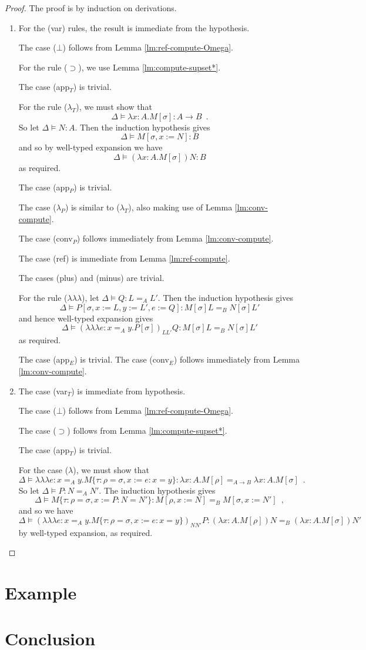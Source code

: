 \documentclass[a4paper,UKenglish]{lipics-v2016}
\newcommand*{\triplelambda}{\ensuremath{\lambda \!\! \lambda \!\! \lambda}}
\theoremstyle{plain}
\begin{document}
\begin{proof}
The proof is by induction on derivations.
\begin{enumerate}
\item
For the (var) rules, the result is immediate from the hypothesis.  

The case ($\bot$) follows from Lemma \ref{lm:ref-compute-Omega}.

For the rule ($\supset$), we use Lemma \ref{lm:compute-supset*}.

The case (app$_T$) is trivial.

For the rule ($\lambda_T$), we must show that
\[ \Delta \models \lambda x:A.M[\sigma] : A \rightarrow B \enspace . \]
So let $\Delta \models N : A$.  Then the induction hypothesis gives
\[ \Delta \models M[\sigma, x:=N] : B \]
and so by well-typed expansion we have
\[ \Delta \models (\lambda x:A.M[\sigma])N : B \]
as required.

The case (app$_P$) is trivial.

The case ($\lambda_P$) is similar to ($\lambda_T$), also making use of Lemma \ref{lm:conv-compute}.

The case (conv$_P$) follows immediately from Lemma \ref{lm:conv-compute}.

The case (ref) is immediate from Lemma \ref{lm:ref-compute}.

The cases (plus) and (minus) are trivial.

For the rule ($\triplelambda$), let $\Delta \models Q : L =_A L'$.  Then the induction hypothesis gives
\[ \Delta \models P [ \sigma, x := L, y := L', e := Q ] : M [\sigma] L =_B N [\sigma] L' \]
and hence well-typed expansion gives
\[ \Delta \models (\triplelambda e:x =_A y.P [ \sigma ])_{L L'} Q : M[\sigma] L =_B N[\sigma] L' \]
as required.

The case (app$_E$) is trivial.  The case (conv$_E$) follows immediately from Lemma \ref{lm:conv-compute}.
\item
The case (var$_T$) is immediate from hypothesis.

The case ($\bot$) follows from Lemma \ref{lm:ref-compute-Omega}.

The case ($\supset$) follows from Lemma \ref{lm:compute-supset*}.

The case (app$_T$) is trivial.

For the case ($\lambda$), we must show that
\[ \Delta \models \triplelambda e : x =_A y. M \{ \tau : \rho = \sigma, x := e : x = y \} : \lambda x:A.M [ \rho ] =_{A \rightarrow B} \lambda x:A.M [ \sigma ] \enspace . \]
So let $\Delta \models P : N =_A N'$.  The induction hypothesis gives
\[ \Delta \models M \{ \tau : \rho = \sigma, x := P : N = N' \} : M [\rho, x := N] =_B M [\sigma, x := N'] \enspace , \]
and so we have
\[ \Delta \models (\triplelambda e : x =_A y. M \{ \tau : \rho = \sigma, x := e : x = y \})_{N N'} P : (\lambda x:A.M [ \rho ])N =_B (\lambda x:A.M [ \sigma ])N'\]
by well-typed expansion, as required.
\end{enumerate}
\end{proof}

\section{Example}

\section{Conclusion}


\end{document}
